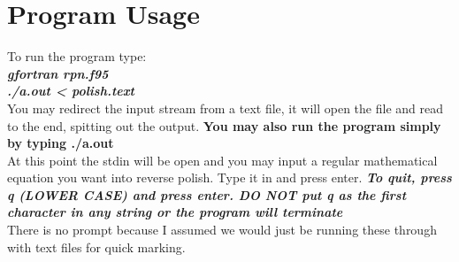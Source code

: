 \documentclass[a4paper,12pt]{article}
\begin{document}
\section{Program Usage}
To run the program type:\\
\textbf{\textit{gfortran rpn.f95}}\\
\textbf{\textit{./a.out  \textless \hspace{.1cm} polish.text}}\\ You may redirect the input stream from a text file, it will open the file and read to the end, spitting out the output.\vspace{.3cm}
\textbf{You may also run the program simply by typing ./a.out}\\
At this point the stdin will be open and you may input a regular mathematical equation you want into reverse polish. Type it in and press enter. \textbf{\textit{ To quit, press q (LOWER CASE) and press enter. DO NOT put q as the first character in any string or the program will terminate}}\\There is no prompt because I assumed we would just be running these through with text files for quick marking.
\end{document}
